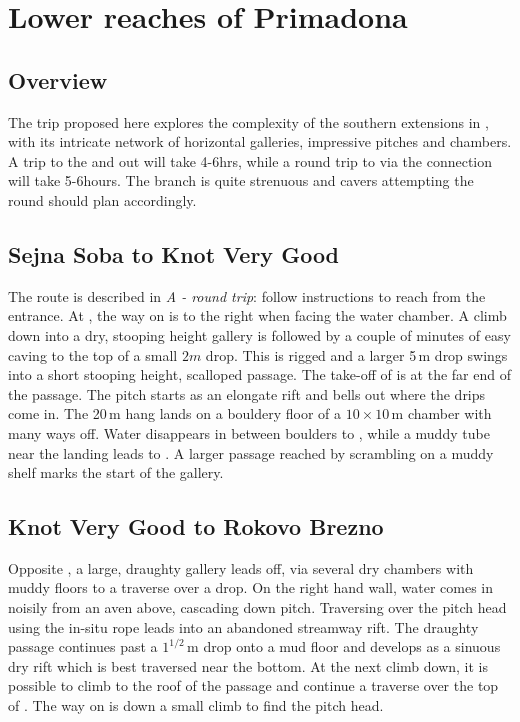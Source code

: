 \section{Lower reaches of Primadona}

\subsection{Overview}
The trip proposed here explores the complexity of the southern extensions in , with its intricate network of horizontal galleries, impressive pitches and chambers. A trip to the  and out will take 4-6hrs, while a round trip to  via the  connection will take 5-6hours. The  branch is quite strenuous and cavers attempting the round should plan accordingly. 

\subsection{Sejna Soba to Knot Very Good}
The route is described in \emph{A - round trip}: follow instructions to reach  from the  entrance. At , the way on is to the right when facing the water chamber. A climb down into a dry, stooping height gallery is followed by a couple of minutes of easy caving to the top of a small $2m$ drop. This is rigged and a larger 5\,m drop swings into a short stooping height, scalloped passage. The take-off of  is at the far end of the passage. The pitch starts as an elongate rift and bells out where the drips come in. The 20\,m hang lands on a bouldery floor of a $10\times10$\,m chamber with many ways off. Water disappears in between boulders to , while a muddy tube near the landing leads to . A larger passage reached by scrambling on a muddy shelf marks the start of the  gallery.

\subsection{Knot Very Good to Rokovo Brezno}
 Opposite , a large, draughty gallery leads off, via several dry chambers with muddy floors to a traverse over a drop. On the right hand wall, water comes in noisily from an aven above, cascading down  pitch. Traversing over the pitch head using the in-situ rope leads into an abandoned streamway rift.  The draughty passage continues past a $1^{1/2}$\,m drop onto a mud floor and develops as a sinuous dry rift which is best traversed near the bottom. At the next climb down, it is possible to climb to the roof of the passage and continue a traverse over the top of . The way on is down a small climb to find the pitch head.

